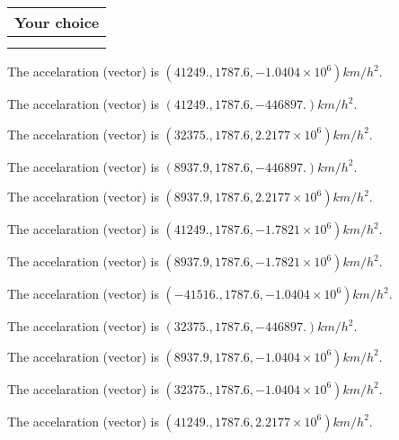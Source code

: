 \documentclass[12pt]{article}
\begin{document}
  
  
\noindent\hspace{3.0in} \begin{tabular}{|l|}
\hline
Your choice \\
\hline
 \\ 
 \\ 
\hline
\end{tabular}
  
  
 
 
The accelaration (vector) is
$(
41249.,
1787.6 ,
-1.0404 \times 10^{6}
)km/h^2.
$
 
 
The accelaration (vector) is
$(
41249.,
1787.6 ,
-446897.
)km/h^2.
$
 
 
The accelaration (vector) is
$(
32375.,
1787.6 ,
2.2177 \times 10^{6}
)km/h^2.
$
 
 
The accelaration (vector) is
$(
8937.9,
1787.6 ,
-446897.
)km/h^2.
$
 
 
The accelaration (vector) is
$(
8937.9,
1787.6 ,
2.2177 \times 10^{6}
)km/h^2.
$
 
 
The accelaration (vector) is
$(
41249.,
1787.6 ,
-1.7821 \times 10^{6}
)km/h^2.
$
 
 
The accelaration (vector) is
$(
8937.9,
1787.6 ,
-1.7821 \times 10^{6}
)km/h^2.
$
 
 
The accelaration (vector) is
$(
-41516.,
1787.6 ,
-1.0404 \times 10^{6}
)km/h^2.
$
 
 
The accelaration (vector) is
$(
32375.,
1787.6 ,
-446897.
)km/h^2.
$
 
 
The accelaration (vector) is
$(
8937.9,
1787.6 ,
-1.0404 \times 10^{6}
)km/h^2.
$
 
 
The accelaration (vector) is
$(
32375.,
1787.6 ,
-1.0404 \times 10^{6}
)km/h^2.
$
 
 
The accelaration (vector) is
$(
41249.,
1787.6 ,
2.2177 \times 10^{6}
)km/h^2.
$
 
 
 
 

 
 
\vspace{0.3in}
  
\vspace{0.2in}
  
\end{document}
